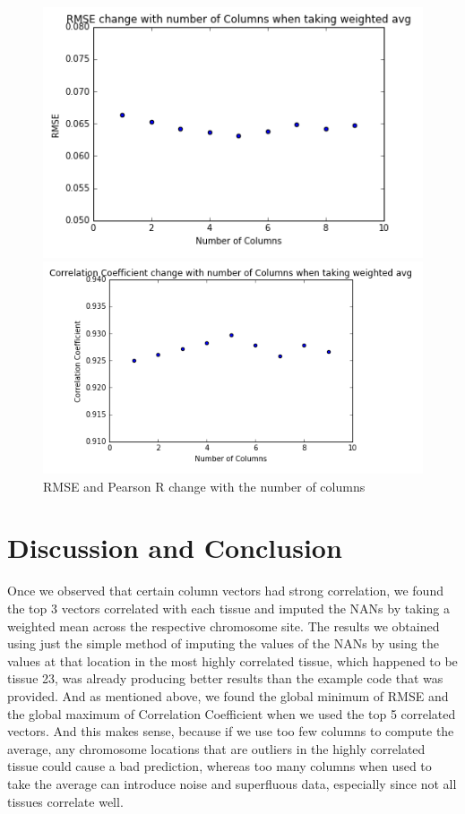 \documentclass{article} %
\begin{document}
\begin{figure}[!ht]
\begin{center}
\caption{RMSE and Pearson R change with the number of columns}
\begin{minipage}[b]{0.40\linewidth}
	\includegraphics[scale=0.3]{RMSEWeightedMeanOpt.png}
\end{minipage}
\quad
\begin{minipage}[b]{0.40\linewidth}
	\includegraphics[scale=0.3]{CorrelationWeightedMeanOpt.png}
\end{minipage}
\end{center}
\end{figure}

\section{Discussion and Conclusion}
Once we observed that certain column vectors had strong correlation, we found the top 3 vectors correlated with each tissue and imputed the NANs by taking a weighted mean across the respective chromosome site. The results we obtained using just the simple method of imputing the values of the NANs by using the values at that location in the most highly correlated tissue, which happened to be tissue 23, was already producing better results than the example code that was provided. And as mentioned above, we found the global minimum of RMSE and the global maximum of Correlation Coefficient when we used the top 5 correlated vectors. And this makes sense, because if we use too few columns to compute the average, any chromosome locations that are outliers in the highly correlated tissue could cause a bad prediction, whereas too many columns when used to take the average can introduce noise and superfluous data, especially since not all tissues correlate well.
\end{document}
